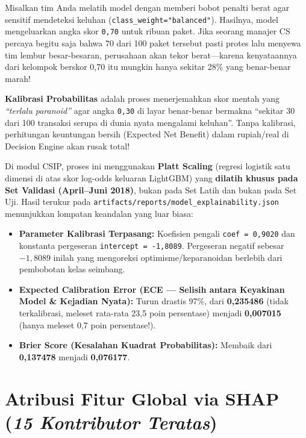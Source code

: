 \documentclass[11pt,a4paper,oneside]{book}
\newcommand{\code}[1]{{\small\nolinkurl{#1}}}
\begin{document}
\begin{bisnisbox}
Misalkan tim Anda melatih model dengan memberi bobot penalti berat agar sensitif mendeteksi keluhan (\code{class_weight="balanced"}). Hasilnya, model mengeluarkan angka skor \code{0,70} untuk ribuan paket. Jika seorang manajer CS percaya begitu saja bahwa 70 dari 100 paket tersebut pasti protes lalu menyewa tim lembur besar-besaran, perusahaan akan tekor berat---karena kenyataannya dari kelompok berskor 0,70 itu mungkin hanya sekitar 28\% yang benar-benar marah!

\textbf{Kalibrasi Probabilitas} adalah proses menerjemahkan skor mentah yang \emph{``terlalu paranoid''} agar angka \code{0,30} di layar benar-benar bermakna ``sekitar 30 dari 100 transaksi serupa di dunia nyata mengalami keluhan''. Tanpa kalibrasi, perhitungan keuntungan bersih (Expected Net Benefit) dalam rupiah/real di Decision Engine akan rusak total!
\end{bisnisbox}

Di modul CSIP, proses ini menggunakan \textbf{Platt Scaling} (regresi logistik satu dimensi di atas skor log-odds keluaran LightGBM) yang \textbf{dilatih khusus pada Set Validasi (April--Juni 2018)}, bukan pada Set Latih dan bukan pada Set Uji. Hasil terukur pada \code{artifacts/reports/model_explainability.json} menunjukkan lompatan keandalan yang luar biasa:
\begin{itemize}
  \item \textbf{Parameter Kalibrasi Terpasang:} Koefisien pengali \code{coef = 0,9020} dan konstanta pergeseran \code{intercept = -1,8089}. Pergeseran negatif sebesar $-1{,}8089$ inilah yang mengoreksi optimisme/keparanoidan berlebih dari pembobotan kelas seimbang.
  \item \textbf{Expected Calibration Error (ECE --- Selisih antara Keyakinan Model \& Kejadian Nyata):} Turun drastis 97\%, dari \textbf{0,235486} (tidak terkalibrasi, meleset rata-rata 23,5 poin persentase) menjadi \textbf{0,007015} (hanya meleset 0,7 poin persentase!).
  \item \textbf{Brier Score (Kesalahan Kuadrat Probabilitas):} Membaik dari \textbf{0,137478} menjadi \textbf{0,076177}.
\end{itemize}

\section{Atribusi Fitur Global via SHAP (\emph{15 Kontributor Teratas})}
\end{document}
